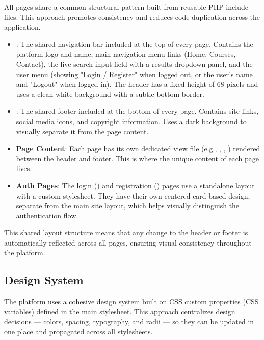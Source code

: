\documentclass[12pt,a4paper]{report}
\begin{document}
All pages share a common structural pattern built from reusable PHP include files. This approach promotes consistency and reduces code duplication across the application.

\begin{itemize}
    \item \textbf{}: The shared navigation bar included at the top of every page. Contains the platform logo and name, main navigation menu links (Home, Courses, Contact), the live search input field with a results dropdown panel, and the user menu (showing "Login / Register" when logged out, or the user's name and "Logout" when logged in). The header has a fixed height of 68 pixels and uses a clean white background with a subtle bottom border.
    
    \item \textbf{}: The shared footer included at the bottom of every page. Contains site links, social media icons, and copyright information. Uses a dark background to visually separate it from the page content.
    
    \item \textbf{Page Content}: Each page has its own dedicated view file (e.g., , , ) rendered between the header and footer. This is where the unique content of each page lives.
    
    \item \textbf{Auth Pages}: The login () and registration () pages use a standalone layout with a custom  stylesheet. They have their own centered card-based design, separate from the main site layout, which helps visually distinguish the authentication flow.
\end{itemize}

This shared layout structure means that any change to the header or footer is automatically reflected across all pages, ensuring visual consistency throughout the platform.

\subsection{Design System}

The platform uses a cohesive design system built on CSS custom properties (CSS variables) defined in the main stylesheet. This approach centralizes design decisions — colors, spacing, typography, and radii — so they can be updated in one place and propagated across all stylesheets.
\end{document}
